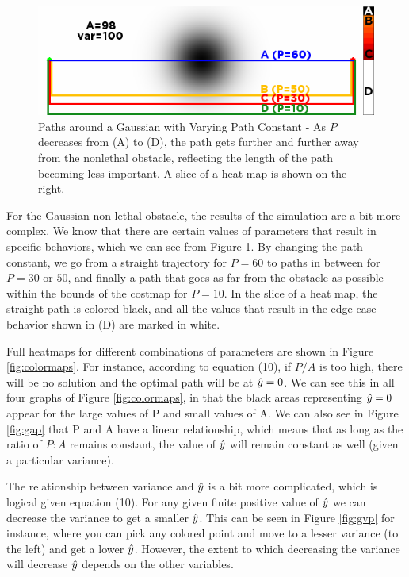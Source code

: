 \begin{figure}
\includegraphics[width=\columnwidth]{graphix/SomePaths.png}
\caption{Paths around a Gaussian with Varying Path Constant - As $P$ decreases from (A) to (D), the path gets further and further away from the nonlethal obstacle, reflecting the length of the path becoming less important. A slice of a heat map is shown on the right.}
\label{fig:somepaths}
\end{figure}

For the Gaussian non-lethal obstacle, the results of the simulation are a bit more complex. We know that there are certain values of parameters that result in specific behaviors, which we can see from Figure \ref{fig:somepaths}. By changing the path constant, we go from a straight trajectory for $P=60$ to paths in between for $P=30$ or $50$, and finally a path that goes as far from the obstacle as possible within the bounds of the costmap for $P=10$. In the slice of a heat map, the straight path is colored black, and all the values that result in the edge case behavior shown in (D) are marked in white. 

Full heatmaps for different combinations of parameters are shown in Figure \ref{fig:colormaps}. For instance, according to equation (10), if $P/A$ is too high, there will be no solution and the optimal path will be at $\hat{y}=0$. We can see this in all four graphs of Figure \ref{fig:colormaps}, in that the black areas representing $\hat{y}=0$ appear for the large values of P and small values of A. We can also see in Figure \ref{fig:gap} that P and A have a linear relationship, which means that as long as the ratio of $P:A$ remains constant, the value of $\hat{y}$ will remain constant as well (given a particular variance). 

The relationship between variance and $\hat{y}$ is a bit more complicated, which is logical given equation (10). For any given finite positive value of $\hat{y}$ we can decrease the variance to get a smaller $\hat{y}$. This can be seen in Figure \ref{fig:gvp} for instance, where you can pick any colored point and move to a lesser variance (to the left) and get a lower $\hat{y}$. However, the extent to which decreasing the variance will decrease $\hat{y}$ depends on the other variables. 

